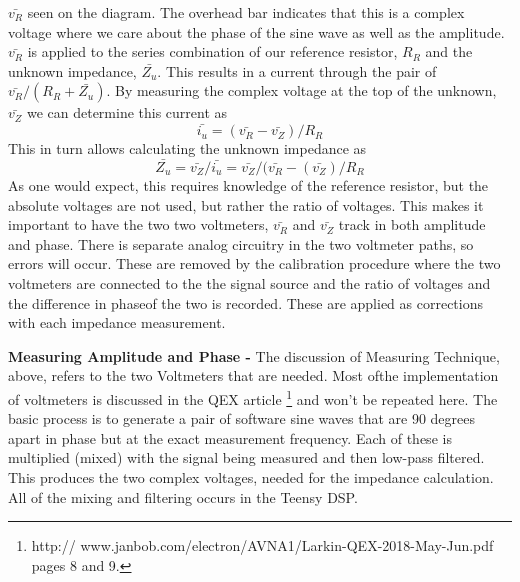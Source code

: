  \(\bar{v_R}\) seen on the diagram. 
The overhead bar indicates that this is a complex voltage where we care about the phase of the sine wave as well as the amplitude.  \(\bar{v_R}\) is applied to the series combination of our reference resistor, \(R_R\) and the unknown impedance, \(\bar{Z_u}\).  This results in a current through the pair  of \(\bar{v_R}/(R_R + \bar{Z_u})\).  By measuring the complex voltage at the top of the unknown, \(\bar{v_Z}\) we can determine this current as
\begin{equation}
 \bar{i_u}=(\bar{v_R} -\bar{v_Z})/R_R
\end{equation}
 This in turn allows calculating the unknown impedance as
\begin{equation}
 \bar{Z_u} = \bar{v_Z}/\bar{i_u}
                    = \bar{v_Z}/(\bar{v_R} -(\bar{v_Z})/R_R
\end{equation}
As one would expect, this requires knowledge of the reference resistor, but the absolute voltages are not used, but rather the ratio of voltages.  This makes it important to have the two two voltmeters, \(\bar{v_R}\) and \(\bar{v_Z}\) track in both amplitude and phase.  There is separate analog circuitry in the two voltmeter paths, so errors will occur.  These are removed by the calibration procedure where the two voltmeters are connected to the the signal source and the ratio  of voltages and the difference in phaseof the two is recorded.   These are applied as corrections with each impedance measurement.

\textbf{Measuring Amplitude and Phase - }The discussion of Measuring Technique, above, refers to the two Voltmeters that are needed.  Most ofthe  implementation of voltmeters is discussed in the QEX article
%
\footnote{http:// www.janbob.com/electron/AVNA1/Larkin-QEX-2018-May-Jun.pdf pages 8 and 9.}
%
and won't be repeated here.  The basic process is to generate a pair of software sine waves that are 90 degrees apart in phase but at the exact measurement frequency.  Each of these is multiplied (mixed) with the signal being measured and then low-pass filtered.  This produces the two complex voltages, needed for the impedance calculation.  All of the mixing and filtering occurs in the Teensy DSP.
